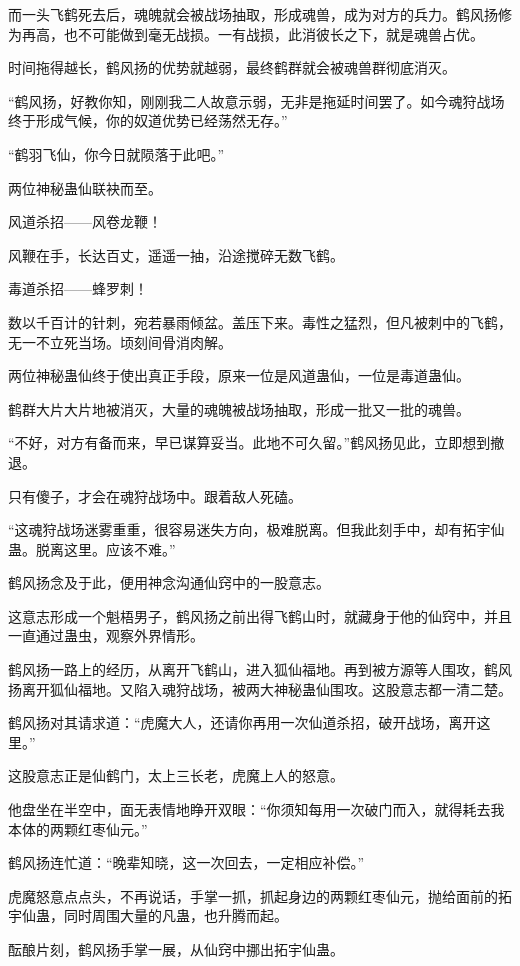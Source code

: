 \begin{this_body}
而一头飞鹤死去后，魂魄就会被战场抽取，形成魂兽，成为对方的兵力。鹤风扬修为再高，也不可能做到毫无战损。一有战损，此消彼长之下，就是魂兽占优。

时间拖得越长，鹤风扬的优势就越弱，最终鹤群就会被魂兽群彻底消灭。

“鹤风扬，好教你知，刚刚我二人故意示弱，无非是拖延时间罢了。如今魂狩战场终于形成气候，你的奴道优势已经荡然无存。”

“鹤羽飞仙，你今日就陨落于此吧。”

两位神秘蛊仙联袂而至。

风道杀招——风卷龙鞭！

风鞭在手，长达百丈，遥遥一抽，沿途搅碎无数飞鹤。

毒道杀招——蜂罗刺！

数以千百计的针刺，宛若暴雨倾盆。盖压下来。毒性之猛烈，但凡被刺中的飞鹤，无一不立死当场。顷刻间骨消肉解。

两位神秘蛊仙终于使出真正手段，原来一位是风道蛊仙，一位是毒道蛊仙。

鹤群大片大片地被消灭，大量的魂魄被战场抽取，形成一批又一批的魂兽。

“不好，对方有备而来，早已谋算妥当。此地不可久留。”鹤风扬见此，立即想到撤退。

只有傻子，才会在魂狩战场中。跟着敌人死磕。

“这魂狩战场迷雾重重，很容易迷失方向，极难脱离。但我此刻手中，却有拓宇仙蛊。脱离这里。应该不难。”

鹤风扬念及于此，便用神念沟通仙窍中的一股意志。

这意志形成一个魁梧男子，鹤风扬之前出得飞鹤山时，就藏身于他的仙窍中，并且一直通过蛊虫，观察外界情形。

鹤风扬一路上的经历，从离开飞鹤山，进入狐仙福地。再到被方源等人围攻，鹤风扬离开狐仙福地。又陷入魂狩战场，被两大神秘蛊仙围攻。这股意志都一清二楚。

鹤风扬对其请求道：“虎魔大人，还请你再用一次仙道杀招，破开战场，离开这里。”

这股意志正是仙鹤门，太上三长老，虎魔上人的怒意。

他盘坐在半空中，面无表情地睁开双眼：“你须知每用一次破门而入，就得耗去我本体的两颗红枣仙元。”

鹤风扬连忙道：“晚辈知晓，这一次回去，一定相应补偿。”

虎魔怒意点点头，不再说话，手掌一抓，抓起身边的两颗红枣仙元，抛给面前的拓宇仙蛊，同时周围大量的凡蛊，也升腾而起。

酝酿片刻，鹤风扬手掌一展，从仙窍中挪出拓宇仙蛊。


\end{this_body}
